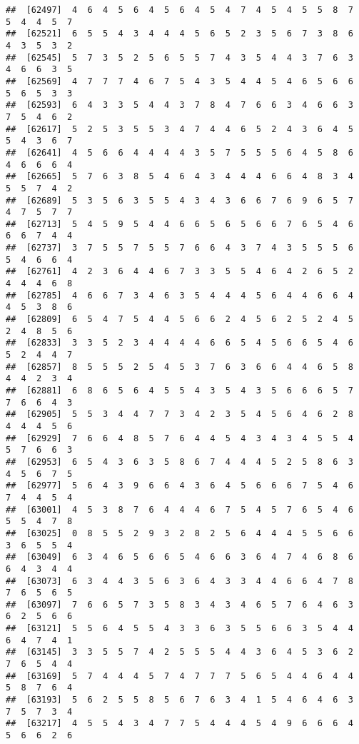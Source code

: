 \documentclass[
]{book}
\begin{document}
\begin{verbatim}
##  [62497]  4  6  4  5  6  4  5  6  4  5  4  7  4  5  4  5  5  8  7  5  4  4  5  7
##  [62521]  6  5  5  4  3  4  4  4  5  6  5  2  3  5  6  7  3  8  6  4  3  5  3  2
##  [62545]  5  7  3  5  2  5  6  5  5  7  4  3  5  4  4  3  7  6  3  4  6  6  3  5
##  [62569]  4  7  7  7  4  6  7  5  4  3  5  4  4  5  4  6  5  6  6  5  6  5  3  3
##  [62593]  6  4  3  3  5  4  4  3  7  8  4  7  6  6  3  4  6  6  3  7  5  4  6  2
##  [62617]  5  2  5  3  5  5  3  4  7  4  4  6  5  2  4  3  6  4  5  5  4  3  6  7
##  [62641]  4  5  6  6  4  4  4  4  3  5  7  5  5  5  6  4  5  8  6  4  6  6  6  4
##  [62665]  5  7  6  3  8  5  4  6  4  3  4  4  4  6  6  4  8  3  4  5  5  7  4  2
##  [62689]  5  3  5  6  3  5  5  4  3  4  3  6  6  7  6  9  6  5  7  4  7  5  7  7
##  [62713]  5  4  5  9  5  4  4  6  6  5  6  5  6  6  7  6  5  4  6  6  6  7  4  4
##  [62737]  3  7  5  5  7  5  5  7  6  6  4  3  7  4  3  5  5  5  6  5  4  6  6  4
##  [62761]  4  2  3  6  4  4  6  7  3  3  5  5  4  6  4  2  6  5  2  4  4  4  6  8
##  [62785]  4  6  6  7  3  4  6  3  5  4  4  4  5  6  4  4  6  6  4  4  5  3  8  6
##  [62809]  6  5  4  7  5  4  4  5  6  6  2  4  5  6  2  5  2  4  5  2  4  8  5  6
##  [62833]  3  3  5  2  3  4  4  4  4  6  6  5  4  5  6  6  5  4  6  5  2  4  4  7
##  [62857]  8  5  5  5  2  5  4  5  3  7  6  3  6  6  4  4  6  5  8  4  4  2  3  4
##  [62881]  6  8  6  5  6  4  5  5  4  3  5  4  3  5  6  6  6  5  7  7  6  6  4  3
##  [62905]  5  5  3  4  4  7  7  3  4  2  3  5  4  5  6  4  6  2  8  4  4  4  5  6
##  [62929]  7  6  6  4  8  5  7  6  4  4  5  4  3  4  3  4  5  5  4  5  7  6  6  3
##  [62953]  6  5  4  3  6  3  5  8  6  7  4  4  4  5  2  5  8  6  3  4  5  6  7  5
##  [62977]  5  6  4  3  9  6  6  4  3  6  4  5  6  6  6  7  5  4  6  7  4  4  5  4
##  [63001]  4  5  3  8  7  6  4  4  4  6  7  5  4  5  7  6  5  4  6  5  5  4  7  8
##  [63025]  0  8  5  5  2  9  3  2  8  2  5  6  4  4  4  5  5  6  6  3  6  5  5  4
##  [63049]  6  3  4  6  5  6  6  5  4  6  6  3  6  4  7  4  6  8  6  6  4  3  4  4
##  [63073]  6  3  4  4  3  5  6  3  6  4  3  3  4  4  6  6  4  7  8  7  6  5  6  5
##  [63097]  7  6  6  5  7  3  5  8  3  4  3  4  6  5  7  6  4  6  3  6  2  5  6  6
##  [63121]  5  5  6  4  5  5  4  3  3  6  3  5  5  6  6  3  5  4  4  6  4  7  4  1
##  [63145]  3  3  5  5  7  4  2  5  5  5  4  4  3  6  4  5  3  6  2  7  6  5  4  4
##  [63169]  5  7  4  4  4  5  7  4  7  7  7  5  6  5  4  4  6  4  4  5  8  7  6  4
##  [63193]  5  6  2  5  5  8  5  6  7  6  3  4  1  5  4  6  4  6  3  7  5  7  3  4
##  [63217]  4  5  5  4  3  4  7  7  5  4  4  4  5  4  9  6  6  6  4  5  6  6  2  6

\end{verbatim}
\end{document}
